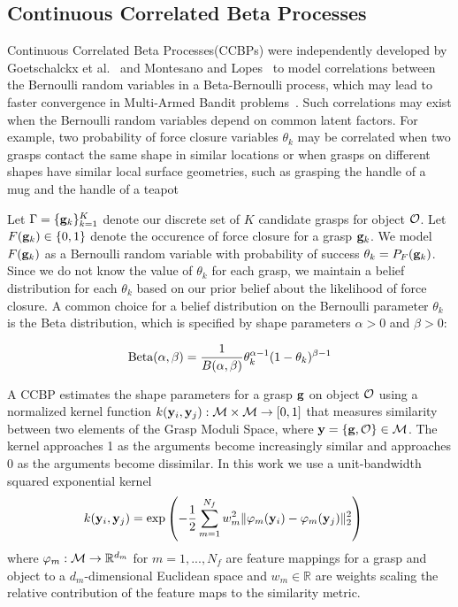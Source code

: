 \subsection{Continuous Correlated Beta Processes}

Continuous Correlated Beta Processes(CCBPs) were independently developed by Goetschalckx et al.~\cite{goetschalckx2011continuous} and Montesano and Lopes~\cite{montesano2012active} to model correlations between the Bernoulli random variables in a Beta-Bernoulli process, which may lead to faster convergence in Multi-Armed Bandit problems~\cite{chu2011contextual}.
Such correlations may exist when the Bernoulli random variables depend on common latent factors.
For example, two probability of force closure variables $\theta_k$ may be correlated when two grasps contact the same shape in similar locations or when grasps on different shapes have similar local surface geometries, such as grasping the handle of a mug and the handle of a teapot

Let $\Gamma = \{\mathbf{g}_k\}_{k=1}^K$ denote our discrete set of $K$ candidate grasps for object $\mathcal{O}$.
Let $F(\mathbf{g}_k) \in \{0, 1\}$ denote the occurence of force closure for a grasp $\mathbf{g}_k$.
We model $F(\mathbf{g}_k)$ as a Bernoulli random variable with probability of success $\theta_k = P_F(\mathbf{g}_k)$.
Since we do not know the value of $\theta_k$ for each grasp, we maintain a belief distribution for each $\theta_k$ based on our prior belief about the likelihood of force closure.
A common choice for a belief distribution on the Bernoulli parameter $\theta_k$ is the Beta distribution, which is specified by shape parameters $\alpha > 0$ and $\beta > 0$:

\vspace{-2ex}
\begin{align*}
	\text{Beta}(\alpha, \beta) = \frac{1}{B(\alpha, \beta)} \theta_k^{\alpha-1} (1 - \theta_k)^{\beta-1}
\end{align*}

A CCBP estimates the shape parameters for a grasp $\mathbf{g}$ on object $\mathcal{O}$ using a normalized kernel function $k(\mathbf{y}_i, \mathbf{y}_j) : \mathcal{M} \times \mathcal{M} \rightarrow [0,1]$ that measures similarity between two elements of the Grasp Moduli Space, where $\mathbf{y} = \{\mathbf{g}, \mathcal{O}\} \in \mathcal{M}$.
The kernel approaches 1 as the arguments become increasingly similar and approaches 0 as the arguments become dissimilar.
In this work we use a unit-bandwidth squared exponential kernel 
\begin{align*}
	k(\mathbf{y}_i, \mathbf{y}_j) &= \exp\left( - \frac{1}{2} \sum \limits_{m=1}^{N_f} w_m^2 \|\varphi_m(\mathbf{y}_i) - \varphi_m(\mathbf{y}_j)\|_2^2 \right)
\end{align*}
\noindent where $\varphi_m: \mathcal{M} \rightarrow \mathbb{R}^{d_m}$ for $m = 1, ..., N_f$ are feature mappings for a grasp and object to a $d_m$-dimensional Euclidean space and $w_m \in \mathbb{R}$ are weights scaling the relative contribution of the feature maps to the similarity metric.

